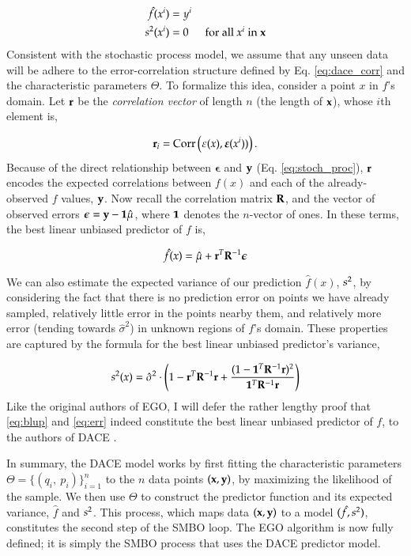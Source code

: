\begin{align}
\hat{f}(x^i)&=y^i\\
s^2(x^i)&=0\ \ \ \ \ \mbox{ for all $x^i$ in $\mathbf{x}$}
\end{align}
Consistent with the stochastic process model, we assume that any unseen data will be adhere to the error-correlation structure defined by Eq. \ref{eq:dace_corr} and the characteristic parameters $\Theta$. To formalize this idea, consider a point $x$ in $f$'s domain. Let $\mathbf{r}$ be the \emph{correlation vector} of length $n$ (the length of $\mathbf{x}$), whose $i$th element is,

\begin{equation}\label{eq:r}
\mathbf{r}_i = \text{Corr}\left( {\varepsilon}(x),\bm{\varepsilon}(x^i))\right).
\end{equation}
Because of the direct relationship between $\bm{\epsilon}$ and $\mathbf{y}$ (Eq. \ref{eq:stoch_proc}), $\mathbf{r}$ encodes the expected correlations between $f(x)$ and each of the already-observed $f$ values, $\mathbf{y}$. Now recall the correlation matrix $\mathbf{R}$, and the vector of observed errors $\bm{\epsilon} = \mathbf{y} - \mathbf{1}\hat{\mu}$, where $\mathbf{1}$ denotes the $n$-vector of ones. In these terms, the best linear unbiased predictor of $f$ is,

\begin{equation}\label{eq:blup}
\hat{f}(x)=\hat{\mu} + \mathbf{r}^T\mathbf{R}^{-1}\mathbf{\bm{\epsilon}}
\end{equation}

We can also estimate the expected variance of our prediction $\hat{f}(x)$, $s^2$, by considering the fact that there is no prediction error on points we have already sampled, relatively little error in the points nearby them, and relatively more error (tending towards $\hat{\sigma}^2$) in unknown regions of $f$'s domain. These properties are captured by the formula for the best linear unbiased predictor's variance,

\begin{equation}\label{eq:err}
s^2(x) = \hat{\sigma}^2 \cdot \left(1 - \mathbf{r}^T\mathbf{R}^{-1}\mathbf{r} + \frac{(1 - \mathbf{1}^T\mathbf{R}^{-1}\mathbf{r})^2}{\mathbf{1}^T\mathbf{R}^{-1}\mathbf{r}} \right)
\end{equation}
Like the original authors of EGO, I will defer the rather lengthy proof that \ref{eq:blup} and \ref{eq:err} indeed constitute the best linear unbiased predictor of $f$, to the authors of DACE \citep{sacks_design_1989}.

In summary, the DACE model works by first fitting the characteristic parameters $\Theta=\{(q_i,\ p_i)\}_{i=1}^n$ to the $n$ data points $(\mathbf{x},\mathbf{y})$, by maximizing the likelihood of the sample. We then use $\Theta$ to construct the predictor function and its expected variance, $\hat{f}$ and $s^2$. This process, which maps data $(\mathbf{x},\mathbf{y})$ to a model $(\hat{f},s^2)$, constitutes the second step of the SMBO loop. The EGO algorithm is now fully defined; it is simply the SMBO process that uses the DACE predictor model.
